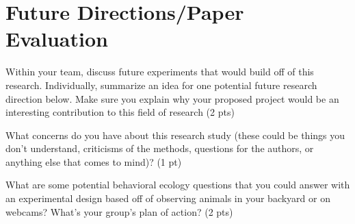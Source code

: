 \documentclass[12pt,a4paper]{article}
\begin{document}
\section*{Future Directions/Paper Evaluation}
\begin{enumerate}[font=\bfseries, wide, resume]
    {\color{under}\item  Within your team, discuss future experiments that would build off of this research. Individually, summarize an idea for one potential future research direction below. Make sure you explain why your proposed project would be an interesting contribution to this field of research (2 pts)}
    
    
    {\color{under}\item What concerns do you have about this research study (these could be things you don’t understand, criticisms of the methods, questions for the authors, or anything else that comes to mind)? (1 pt)}
    
    
    {\color{under}\item  What are some potential behavioral ecology questions that you could answer with an experimental design based off of observing animals in your backyard or on webcams? What’s your group's plan of action? (2 pts)}  
\end{enumerate}
\end{document}
